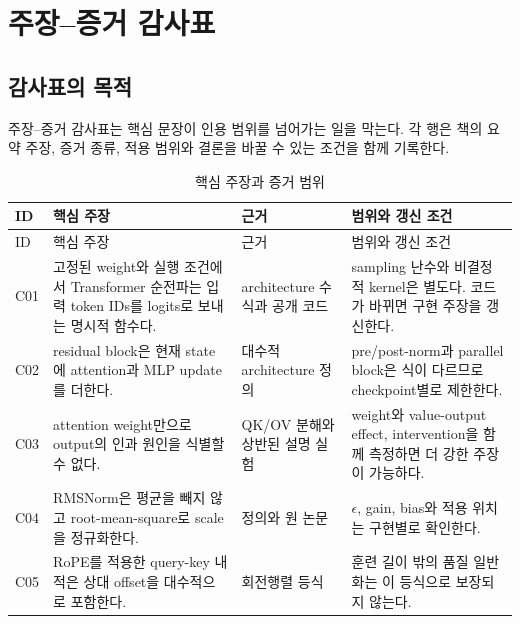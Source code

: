 \chapter{주장--증거 감사표}
\label{app:claim-ledger}

\section{감사표의 목적}

주장--증거 감사표는 핵심 문장이 인용 범위를 넘어가는 일을 막는다.
각 행은 책의 요약 주장, 증거 종류, 적용 범위와 결론을 바꿀 수 있는 조건을 함께 기록한다.

\small
\begin{longtable}{@{}p{}p{}p{}p{}@{}}
\caption{핵심 주장과 증거 범위}\label{tab:claim-ledger}\\
\toprule
ID & 핵심 주장 & 근거 & 범위와 갱신 조건 \\
\midrule
\endfirsthead
\toprule
ID & 핵심 주장 & 근거 & 범위와 갱신 조건 \\
\midrule
\endhead
C01 & 고정된 weight와 실행 조건에서 Transformer 순전파는 입력 token IDs를 logits로 보내는 명시적 함수다. & architecture 수식과 공개 코드 \citep{vaswani2017attention,meta2024llama3code} & sampling 난수와 비결정적 kernel은 별도다. 코드가 바뀌면 구현 주장을 갱신한다. \\

C02 & residual block은 현재 state에 attention과 MLP update를 더한다. & 대수적 architecture 정의 \citep{vaswani2017attention,elhage2021framework} & pre/post-norm과 parallel block은 식이 다르므로 checkpoint별로 제한한다. \\

C03 & attention weight만으로 output의 인과 원인을 식별할 수 없다. & QK/OV 분해와 상반된 설명 실험 \citep{jain2019attention,wiegreffe2019attention} & weight와 value-output effect, intervention을 함께 측정하면 더 강한 주장이 가능하다. \\

C04 & RMSNorm은 평균을 빼지 않고 root-mean-square로 scale을 정규화한다. & 정의와 원 논문 \citep{zhang2019rmsnorm} & $\epsilon$, gain, bias와 적용 위치는 구현별로 확인한다. \\

C05 & RoPE를 적용한 query-key 내적은 상대 offset을 대수적으로 포함한다. & 회전행렬 등식 \citep{su2021roformer} & 훈련 길이 밖의 품질 일반화는 이 등식으로 보장되지 않는다. \\


\end{longtable}
